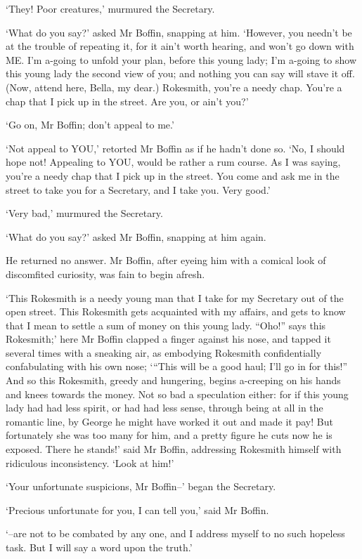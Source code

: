 ‘They! Poor creatures,’ murmured the Secretary.

‘What do you say?’ asked Mr Boffin, snapping at him. ‘However, you
needn’t be at the trouble of repeating it, for it ain’t worth hearing,
and won’t go down with ME. I’m a-going to unfold your plan, before this
young lady; I’m a-going to show this young lady the second view of you;
and nothing you can say will stave it off. (Now, attend here, Bella, my
dear.) Rokesmith, you’re a needy chap. You’re a chap that I pick up in
the street. Are you, or ain’t you?’

‘Go on, Mr Boffin; don’t appeal to me.’

‘Not appeal to YOU,’ retorted Mr Boffin as if he hadn’t done so. ‘No,
I should hope not! Appealing to YOU, would be rather a rum course. As I
was saying, you’re a needy chap that I pick up in the street. You come
and ask me in the street to take you for a Secretary, and I take you.
Very good.’

‘Very bad,’ murmured the Secretary.

‘What do you say?’ asked Mr Boffin, snapping at him again.

He returned no answer. Mr Boffin, after eyeing him with a comical look
of discomfited curiosity, was fain to begin afresh.

‘This Rokesmith is a needy young man that I take for my Secretary out
of the open street. This Rokesmith gets acquainted with my affairs, and
gets to know that I mean to settle a sum of money on this young lady.
“Oho!” says this Rokesmith;’ here Mr Boffin clapped a finger against
his nose, and tapped it several times with a sneaking air, as embodying
Rokesmith confidentially confabulating with his own nose; ‘“This will
be a good haul; I’ll go in for this!” And so this Rokesmith, greedy and
hungering, begins a-creeping on his hands and knees towards the money.
Not so bad a speculation either: for if this young lady had had less
spirit, or had had less sense, through being at all in the romantic
line, by George he might have worked it out and made it pay! But
fortunately she was too many for him, and a pretty figure he cuts now
he is exposed. There he stands!’ said Mr Boffin, addressing Rokesmith
himself with ridiculous inconsistency. ‘Look at him!’

‘Your unfortunate suspicions, Mr Boffin--’ began the Secretary.

‘Precious unfortunate for you, I can tell you,’ said Mr Boffin.

‘--are not to be combated by any one, and I address myself to no such
hopeless task. But I will say a word upon the truth.’

